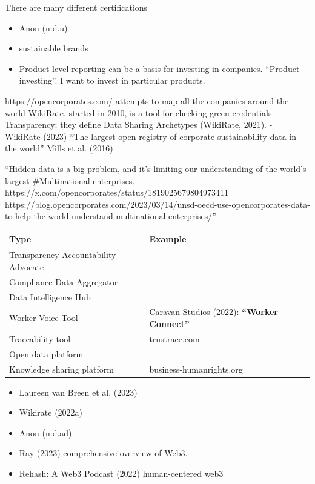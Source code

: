 \documentclass[
  letterpaper,
  DIV=11,
  numbers=noendperiod]{scrartcl}
\providecommand{\tightlist}{%
  \setlength{\itemsep}{0pt}\setlength{\parskip}{0pt}}\usepackage{longtable,booktabs,array}
\begin{document}
There are many different certifications

\begin{itemize}
\item
  Anon (n.d.u)
\item
  sustainable brands
\item
  Product-level reporting can be a basis for investing in companies.
  ``Product-investing''. I want to invest in particular products.
\end{itemize}

https://opencorporates.com/ attempts to map all the companies around the
world WikiRate, started in 2010, is a tool for checking green
credentials Transparency; they define Data Sharing Archetypes (WikiRate,
2021). - WikiRate (2023) ``The largest open registry of corporate
sustainability data in the world'' Mills et al. (2016)

``Hidden data is a big problem, and it's limiting our understanding of
the world's largest \#Multinational enterprises.
https://x.com/opencorporates/status/1819025679804973411
https://blog.opencorporates.com/2023/03/14/unsd-oecd-use-opencorporates-data-to-help-the-world-understand-multinational-enterprises/''

\begin{longtable}[]{@{}
  >{\raggedright\arraybackslash}p{}
  >{\raggedright\arraybackslash}p{}@{}}
\toprule\noalign{}
\begin{minipage}[b]{\linewidth}\raggedright
Type
\end{minipage} & \begin{minipage}[b]{\linewidth}\raggedright
Example
\end{minipage} \\
\midrule\noalign{}
\endhead
\bottomrule\noalign{}
\endlastfoot
Transparency Accountability Advocate & \\
Compliance Data Aggregator & \\
Data Intelligence Hub & \\
Worker Voice Tool & Caravan Studios (2022): \textbf{``Worker
Connect''} \\
Traceability tool & trustrace.com \\
Open data platform & \\
Knowledge sharing platform & business-humanrights.org \\
\end{longtable}

\begin{itemize}
\tightlist
\item
  Laureen van Breen et al. (2023)
\item
  Wikirate (2022a)
\item
  Anon (n.d.ad)
\item
  Ray (2023) comprehensive overview of Web3.
\item
  Rehash: A Web3 Podcast (2022) human-centered web3
\end{itemize}
\end{document}

